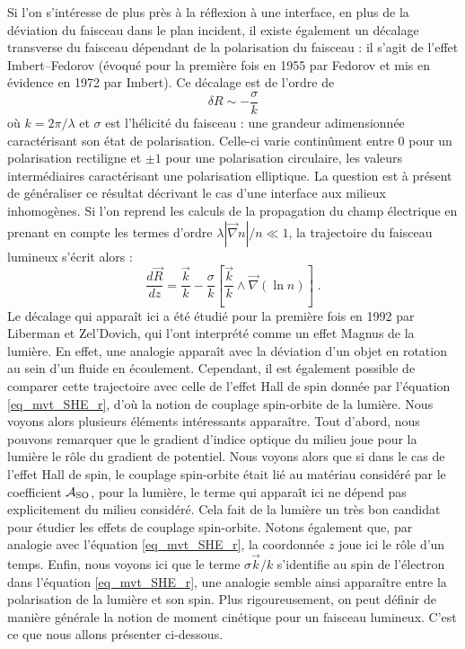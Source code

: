 \documentclass[a4paper,11pt]{article} %
\begin{document}
	Si l'on s'intéresse de plus près à la réflexion à une interface, en plus de la déviation du faisceau dans le plan incident, il existe également un décalage transverse du faisceau dépendant de la polarisation du faisceau : il s'agit de l'effet Imbert--Fedorov (évoqué pour la première fois en 1955 par Fedorov et mis en évidence en 1972 par Imbert). Ce décalage est de l'ordre de
	\begin{equation*}
		\delta R \sim - \frac{\sigma}{k}
	\end{equation*}
	où $ k= 2\pi / \lambda $ et $ \sigma $ est l'hélicité du faisceau : une grandeur adimensionnée caractérisant son état de polarisation. Celle-ci varie continûment entre 0 pour un polarisation rectiligne et $\pm 1 $ pour une polarisation circulaire, les valeurs intermédiaires caractérisant une polarisation elliptique. La question est à présent de généraliser ce résultat décrivant le cas d'une interface aux milieux inhomogènes. Si l'on reprend les calculs de la propagation du champ électrique en prenant en compte les termes d'ordre $ \lambda | \vec{\nabla}n | / n \ll 1$, la trajectoire du faisceau lumineux s'écrit alors :
	\begin{equation}
		\label{eq_Magnus}
		\frac{d \vec{R}}{dz} = \frac{\vec{k}}{k} - \frac{\sigma}{k} \left[ \frac{\vec{k}}{k} \wedge \vec{\nabla}(\ln n) \right] \; .
	\end{equation}
	Le décalage qui apparaît ici a été étudié pour la première fois en 1992 par Liberman et Zel'Dovich, qui l'ont interprété comme un effet Magnus de la lumière. En effet, une analogie apparaît avec la déviation d'un objet en rotation au sein d'un fluide en écoulement. Cependant, il est également possible de comparer cette trajectoire avec celle de l'effet Hall de spin donnée par l'équation \eqref{eq_mvt_SHE_r}, d'où la notion de couplage spin-orbite de la lumière. Nous voyons alors plusieurs éléments intéressants apparaître. Tout d'abord, nous pouvons remarquer que le gradient d'indice optique du milieu joue pour la lumière le rôle du gradient de potentiel. Nous voyons alors que si dans le cas de l'effet Hall de spin, le couplage spin-orbite était lié au matériau considéré par le coefficient $ \mathcal{A}_\textup{SO} $, pour la lumière, le terme qui apparaît ici ne dépend pas explicitement du milieu considéré. Cela fait de la lumière un très bon candidat pour étudier les effets de couplage spin-orbite. Notons également que, par analogie avec l'équation \eqref{eq_mvt_SHE_r}, la coordonnée $z$ joue ici le rôle d'un temps. Enfin, nous voyons ici que le terme $ \sigma \vec{k} /k $ s'identifie au spin de l'électron dans l'équation \eqref{eq_mvt_SHE_r}, une analogie semble ainsi apparaître entre la polarisation de la lumière et son spin. Plus rigoureusement, on peut définir de manière générale la notion de moment cinétique pour un faisceau lumineux. C'est ce que nous allons présenter ci-dessous.
	
\end{document}
